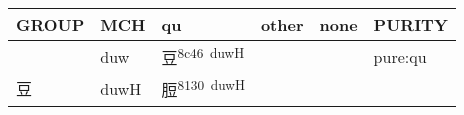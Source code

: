 \documentclass[14pt,a4paper]{scrartcl}
\begin{document}
\begin{longtable}[c]{@{}llllll@{}}
\toprule
\begin{minipage}[b]{0.14\columnwidth}\raggedright\strut
GROUP
\strut\end{minipage} &
\begin{minipage}[b]{0.14\columnwidth}\raggedright\strut
MCH
\strut\end{minipage} &
\begin{minipage}[b]{0.14\columnwidth}\raggedright\strut
qu
\strut\end{minipage} &
\begin{minipage}[b]{0.14\columnwidth}\raggedright\strut
other
\strut\end{minipage} &
\begin{minipage}[b]{0.14\columnwidth}\raggedright\strut
none
\strut\end{minipage} &
\begin{minipage}[b]{0.14\columnwidth}\raggedright\strut
PURITY
\strut\end{minipage}\tabularnewline
\midrule
\endhead
\begin{minipage}[t]{0.14\columnwidth}\raggedright\strut
𤽋
\strut\end{minipage} &
\begin{minipage}[t]{0.14\columnwidth}\raggedright\strut
duw
\strut\end{minipage} &
\begin{minipage}[t]{0.14\columnwidth}\raggedright\strut
豆\textsuperscript{8c46~duwH}
\strut\end{minipage} &
\begin{minipage}[t]{0.14\columnwidth}\raggedright\strut
\strut\end{minipage} &
\begin{minipage}[t]{0.14\columnwidth}\raggedright\strut
\strut\end{minipage} &
\begin{minipage}[t]{0.14\columnwidth}\raggedright\strut
pure:qu
\strut\end{minipage}\tabularnewline
\begin{minipage}[t]{0.14\columnwidth}\raggedright\strut
豆
\strut\end{minipage} &
\begin{minipage}[t]{0.14\columnwidth}\raggedright\strut
duwH
\strut\end{minipage} &
\begin{minipage}[t]{0.14\columnwidth}\raggedright\strut
脰\textsuperscript{8130~duwH}
\strut\end{minipage} &

\end{longtable}
\end{document}
